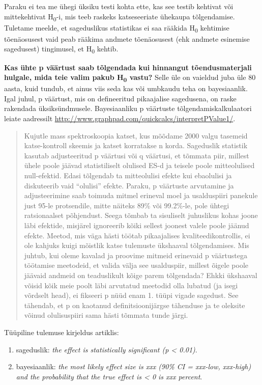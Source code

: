 \documentclass[]{book}
\begin{document}
Paraku ei tea me ühegi üksiku testi kohta ette, kas see testib kehtivat või mittekehtivat H\textsubscript{0}-i, mis teeb raskeks katseseeriate ühekaupa tõlgendamise.
Tuletame meelde, et sageduslikus statistikas ei saa rääkida H\textsubscript{0} kehtimise tõenäosusest vaid peab rääkima andmete tõenäosusest (ehk andmete esinemise sagedusest) tingimusel, et H\textsubscript{0} kehtib.

\textbf{Kas ühte p väärtust saab tõlgendada kui hinnangut tõendusmaterjali hulgale, mida teie valim pakub H\textsubscript{0} vastu?}
Selle üle on vaieldud juba üle 80 aasta, kuid tundub, et ainus viis seda kas või umbkaudu teha on bayesiaanlik.
Igal juhul, p väärtust, mis on defineeritud pikaajalise sagedusena, on raske rakendada üksiksündmusele.
Bayesiaanliku p väärtuste tõlgendamiskalkulaatori leiate aadressilt \url{http://www.graphpad.com/quickcalcs/interpretPValue1/}.

\begin{quote}
Kujutle mass spektroskoopia katset, kus mõõdame 2000 valgu tasemeid katse-kontroll skeemis ja katset korratakse n korda. Sageduslik statistik kasutab adjusteeritud p väärtusi või q väärtusi, et tõmmata piir, millest ühele poole jäävad statistiliselt olulised ES-d ja teisele poole mitteolulised null-efektid. Edasi tõlgendab ta mitteolulisi efekte kui ebaolulisi ja diskuteerib vaid ``olulisi'' efekte. Paraku, p väärtuste arvutamine ja adjusteerimine saab toimuda mitmel erineval moel ja usalduspiiri panekule just 95-le protsendile, mitte näiteks 89\% või 99.2\%-le, pole ühtegi ratsionaalset põhjendust. Seega tõmbab ta sisuliselt juhuslikus kohas joone läbi efektide, misjärel ignoreerib kõiki sellest joonest valele poole jäänud efekte. Meetod, mis väga hästi töötab pikaajalises kvaliteedikontrollis, ei ole kahjuks kuigi mõistlik katse tulemuste ükshaaval tõlgendamises. Mis juhtub, kui oleme kavalad ja proovime mitmeid erinevaid p väärtustega töötamise meetodeid, et valida välja see usalduspiir, millest õigele poole jäävaid andmeid on teaduslikult kõige parem tõlgendada? Ehkki ükshaaval võisid kõik meie poolt läbi arvutatud meetodid olla lubatud (ja isegi võrdselt head), ei fikseeri p nüüd enam 1. tüüpi vigade sagedust. See tähendab, et p on kaotanud definitsioonijärgse tähenduse ja te oleksite võinud olulisuspiiri sama hästi tõmmata tunde järgi.
\end{quote}

Tüüpiline tulemuse kirjeldus artiklis:

\begin{enumerate}
\def\labelenumi{\arabic{enumi}.}
\item
  sageduslik: \emph{the effect is statistically significant (p \textless{} 0.01)}.
\item
  bayesiaanlik: \emph{the most likely effect size is xxx (90\% CI = xxx-low, xxx-high) and the probability that the true effect is \textless{} 0 is xxx percent}.
\end{enumerate}
\end{document}

